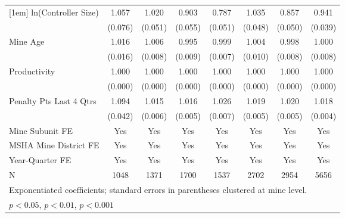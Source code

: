 {\begin{tabular}{l*{7}{c}}
[1em]
ln(Controller Size)      &       1.057         &       1.020         &       0.903         &       0.787\sym{***}&       1.035         &       0.857\sym{**} &       0.941         \\
                         &     (0.076)         &     (0.051)         &     (0.055)         &     (0.051)         &     (0.048)         &     (0.050)         &     (0.039)         \\
[1em]
Mine Age                 &       1.016         &       1.006         &       0.995         &       0.999         &       1.004         &       0.998         &       1.000         \\
                         &     (0.016)         &     (0.008)         &     (0.009)         &     (0.007)         &     (0.010)         &     (0.008)         &     (0.008)         \\
[1em]
Productivity             &       1.000         &       1.000         &       1.000         &       1.000         &       1.000         &       1.000         &       1.000         \\
                         &     (0.000)         &     (0.000)         &     (0.000)         &     (0.000)         &     (0.000)         &     (0.000)         &     (0.000)         \\
[1em]
Penalty Pts Last 4 Qtrs  &       1.094\sym{*}  &       1.015\sym{*}  &       1.016\sym{***}&       1.026\sym{***}&       1.019\sym{***}&       1.020\sym{***}&       1.018\sym{***}\\
                         &     (0.042)         &     (0.006)         &     (0.005)         &     (0.007)         &     (0.005)         &     (0.005)         &     (0.004)         \\
[1em]
Mine Subunit FE          &         Yes         &         Yes         &         Yes         &         Yes         &         Yes         &         Yes         &         Yes         \\
[1em]
MSHA Mine District FE    &         Yes         &         Yes         &         Yes         &         Yes         &         Yes         &         Yes         &         Yes         \\
[1em]
Year-Quarter FE          &         Yes         &         Yes         &         Yes         &         Yes         &         Yes         &         Yes         &         Yes         \\
\hline
N                        &        1048         &        1371         &        1700         &        1537         &        2702         &        2954         &        5656         \\
\hline\hline
\multicolumn{8}{l}{\footnotesize Exponentiated coefficients; standard errors in parentheses clustered at mine level.}\\
\multicolumn{8}{l}{\footnotesize \sym{*} \(p<0.05\), \sym{**} \(p<0.01\), \sym{***} \(p<0.001\)}\\
\end{tabular}
}
